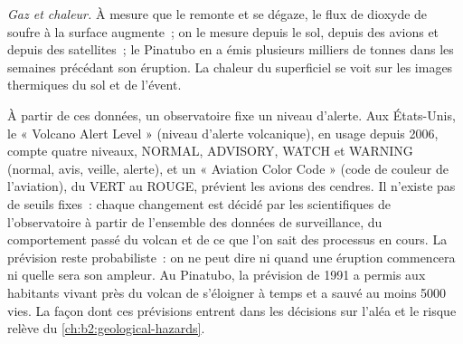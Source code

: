 \begin{omfigure}
\centering
{}
\par{}
\end{omfigure}

\emph{Gaz et chaleur.} À mesure que le  remonte et se dégaze, le flux de dioxyde de soufre à la
surface augmente~; on le mesure depuis le sol, depuis des avions et depuis des satellites~; le Pinatubo en a émis
plusieurs milliers de tonnes dans les semaines précédant son éruption.
La chaleur du  superficiel se voit sur les images thermiques du sol et de l'évent.

À partir de ces données, un observatoire fixe un niveau d'alerte. Aux États-Unis, le « Volcano Alert Level »
(niveau d'alerte volcanique), en usage depuis 2006, compte quatre niveaux, NORMAL, ADVISORY, WATCH et WARNING
(normal, avis, veille, alerte), et un « Aviation Color Code » (code de couleur de l'aviation), du VERT au ROUGE,
prévient les avions des cendres. Il n'existe pas de seuils fixes~: chaque changement est décidé par les
scientifiques de l'observatoire à partir de l'ensemble des données de surveillance, du comportement passé
du volcan et de ce que l'on sait des processus en cours. La prévision reste probabiliste~: on ne peut
dire ni quand une éruption commencera ni quelle sera son ampleur. Au Pinatubo, la prévision de 1991
a permis aux habitants vivant près du volcan de s'éloigner à temps et a sauvé au moins \num{5000} vies.
La façon dont ces prévisions entrent dans les décisions sur l'aléa et le risque relève du
\cref{ch:b2:geological-hazards}.

